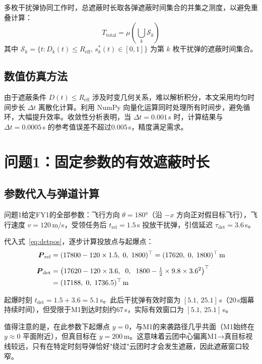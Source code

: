 \documentclass[12pt, a4paper]{article}
\begin{document}
多枚干扰弹协同工作时，总遮蔽时长取各弹遮蔽时间集合的并集之测度，以避免重叠计算：
\begin{equation}
T_{\mathrm{total}} = \mu\!\left(\bigcup_{k} \mathcal{S}_k\right)
\end{equation}
其中 $\mathcal{S}_k = \{t : D_k(t) \le R_{\mathrm{eff}},\, s_k^*(t)\in[0,1]\}$ 为第 $k$ 枚干扰弹的遮蔽时间集合。

\subsection{数值仿真方法}

由于遮蔽条件 $D(t) \le R_{\mathrm{eff}}$ 涉及时变几何关系，难以解析积分，本文采用均匀时间步长 $\Delta t$ 离散化计算。利用 NumPy 向量化运算同时处理所有时间步，避免循环，大幅提升效率。收敛性分析表明，当 $\Delta t = 0.001$\,s 时，计算结果与 $\Delta t = 0.0005$\,s 的参考值误差不超过0.005\,s，精度满足需求。

\section{问题1：固定参数的有效遮蔽时长}

\subsection{参数代入与弹道计算}

问题1给定FY1的全部参数：飞行方向 $\theta=180°$（沿 $-x$ 方向正对假目标飞行），飞行速度 $v=120$\,m/s，受领任务后 $t_{\mathrm{rel}}=1.5$\,s 投放干扰弹，引信延迟 $\tau_{\mathrm{det}}=3.6$\,s。

代入式~\eqref{eq:detpos}，逐步计算投放点与起爆点：
\begin{align}
\boldsymbol{P}_{\mathrm{rel}} &= (17800 - 120\times1.5,\;0,\;1800)^{\top} = (17620,\;0,\;1800)^{\top}\,\text{m} \\[4pt]
\boldsymbol{P}_{\mathrm{det}} &= \left(17620 - 120\times3.6,\;\;0,\;\;1800-\tfrac{1}{2}\times9.8\times3.6^2\right)^{\top} \notag\\
&= (17188,\;0,\;1736.5)^{\top}\,\text{m}
\end{align}

起爆时刻 $t_{\mathrm{det}}=1.5+3.6=5.1$\,s。此后干扰弹有效时窗为 $[5.1,\,25.1]$\,s（20\,s烟幕持续时间），但受限于M1到达时刻约67\,s，实际有效窗口为 $[5.1,\,25.1]$\,s。

值得注意的是，在此参数下起爆点 $y=0$，与M1的来袭路径几乎共面（M1始终在 $y\approx0$ 平面附近），但真目标在 $y=200$\,m。这意味着云团中心偏离M1→真目标视线较远，只有在特定时刻导弹恰好"绕过"云团时才会发生遮蔽，因此遮蔽窗口较窄。
\end{document}
